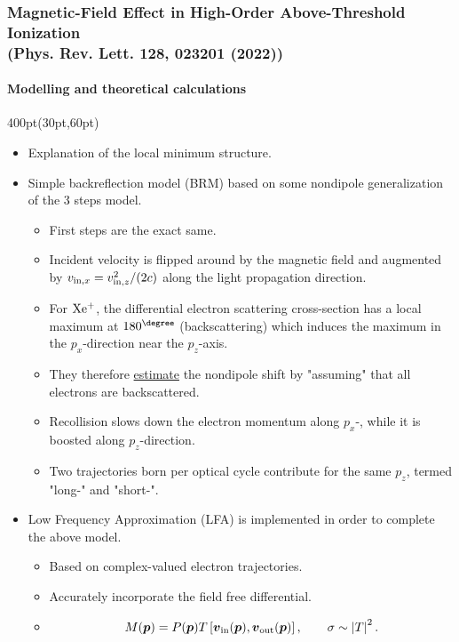 \begin{frame}
\frametitle{Magnetic-Field Effect in High-Order Above-Threshold Ionization \\
\small (Phys. Rev. Lett. 128, 023201 (2022))}
\framesubtitle{Modelling and theoretical calculations}


\small
\begin{textblock*}{400pt}(30pt,60pt)
\begin{itemize}
\footnotesize
\item Explanation of the local minimum structure.
\item Simple backreflection model (BRM) based on some 
nondipole generalization of the 3 steps model.
\begin{itemize}
\footnotesize
\item[$\bullet$] First steps are the exact same.
\item[$\bullet$] Incident velocity is flipped around by the magnetic field 
and augmented by $v_{{\rm in},x} = v_{{\rm in},z}^2/(2c)$ 
along the light propagation direction.
\item[$\bullet$] For $\rm Xe^+$, the differential electron scattering 
cross-section has a local maximum at $180^{\degree}$ (backscattering) 
which induces the maximum in the $p_x$-direction near the $p_z$-axis.
\item[$\bullet$] They therefore \underline{estimate} the nondipole shift
by "assuming" that all electrons are backscattered.
\item[$\bullet$] Recollision slows down the electron momentum along $p_x$-, 
while it is boosted along $p_z$-direction.
\item[$\bullet$] Two trajectories born per optical cycle 
contribute for the same $p_z$, termed "long-" and "short-".
\end{itemize}
\item Low Frequency Approximation (LFA) is implemented in order to complete 
the above model.
\begin{itemize}
\footnotesize
\item[$\bullet$] Based on complex-valued electron trajectories.
\item[$\bullet$] Accurately incorporate the field free differential. 
\item[$\bullet$] 
\begin{align}
M(\boldsymbol{p}) = P(\boldsymbol{p}) 
T\left[ \boldsymbol{v}_{\rm in}(\boldsymbol{p}), 
\boldsymbol{v}_{\rm out}(\boldsymbol{p})\right], 
\hspace{20pt}\sigma \sim \left|  T\right|^2. \nonumber
\end{align}
\end{itemize}

\end{itemize}
\end{textblock*}

\end{frame}


